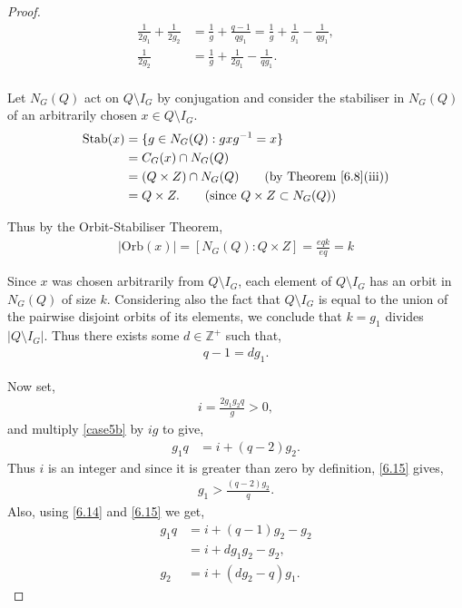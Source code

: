 \begin{proof}
\begin{align} \label{case5b} \frac{1}{2g_1} + \frac{1}{2g_2} &= \frac{1}{g} + \frac{q-1}{qg_1} = \frac{1}{g} + \frac{1}{g_1} - \frac{1}{qg_1}, \nonumber \\[1.5ex]
 \frac{1}{2g_2} &= \frac{1}{g} + \frac{1}{2g_1} - \frac{1}{qg_1}.
\end{align}
\\
Let $N_G(Q)$ act on $Q \! \setminus \! I_G$ by conjugation and consider the stabiliser in $N_G(Q)$ of an arbitrarily chosen $x \in Q \! \setminus \! I_G$.
\begin{align*} \text{Stab}(x) &= \{ g \in N_G(Q) : g x g^{-1} = x \}
\\ &= C_G(x) \cap N_G(Q)
\\ &= (Q \times Z) \cap N_G(Q) \tag{by Theorem \ref{6.8}(iii)}
\\ &= Q \times Z. \tag{since $Q \times Z \subset N_G(Q)$}
\end{align*}

Thus by the Orbit-Stabiliser Theorem,
\begin{align*} |\text{Orb}(x)| = [N_G(Q) : Q \times Z] = \frac{eqk}{eq} = k
\end{align*}

Since $x$ was chosen arbitrarily from $Q \! \setminus \! I_G$, each element of $Q \! \setminus \! I_G$ has an orbit in $N_G(Q)$ of size $k$. Considering also the fact that $Q \! \setminus \! I_G$ is equal to the union of the pairwise disjoint orbits of its elements, we conclude that $k = g_1$ divides $|Q \! \setminus \! I_G|$. Thus there exists some $d \in \mathbb{Z^+}$ such that,
\begin{align}\label{6.14} q-1 = d g_1.
\end{align}

Now set,
\begin{align} \label{6.14a} i = \frac{2 g_1 g_2 q}{g} > 0,
\end{align}
and multiply \eqref{case5b} by $ig$ to give,
\begin{align}\label{6.15} g_1 q &= i + (q-2) g_2.
\end{align}
Thus $i$ is an integer and since it is greater than zero by definition, \eqref{6.15} gives,
\begin{align}\label{6.16b} g_1 > \frac{(q-2) g_2}{q}.
\end{align}
Also, using \eqref{6.14} and \eqref{6.15} we get,
\begin{align}\label{6.16a} g_1 q &= i + (q-1) g_2 - g_2 \nonumber
\\ &= i + d g_1 g_2 - g_2, \nonumber
\\ g_2 &= i + (d g_2 - q) g_1.
\end{align}


\end{proof}

